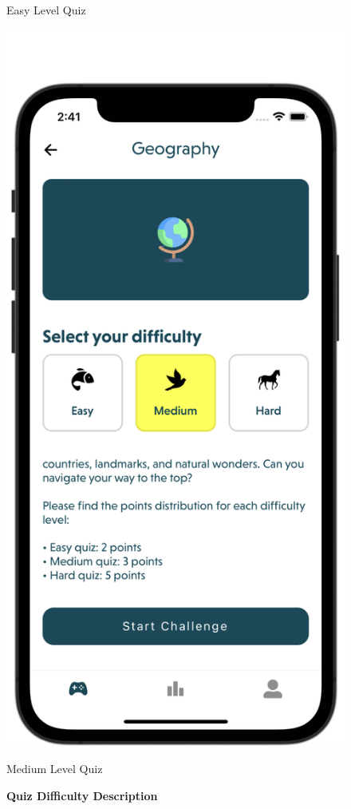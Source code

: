 \begin{figure}[H]
\begin{minipage}[b]{0.43\linewidth}
        \caption{Easy Level Quiz}
    \end{minipage}
    \hspace{0.1\linewidth}
    \begin{minipage}[b]{0.43\linewidth}
        \centering
        \includegraphics[width=\linewidth]{Mobile UI/Medium Level Quiz.png}
        \caption{Medium Level Quiz}
    \end{minipage}
    \vspace{0.5cm}
    \caption{\textbf{Quiz Difficulty Description}}
\end{figure}


